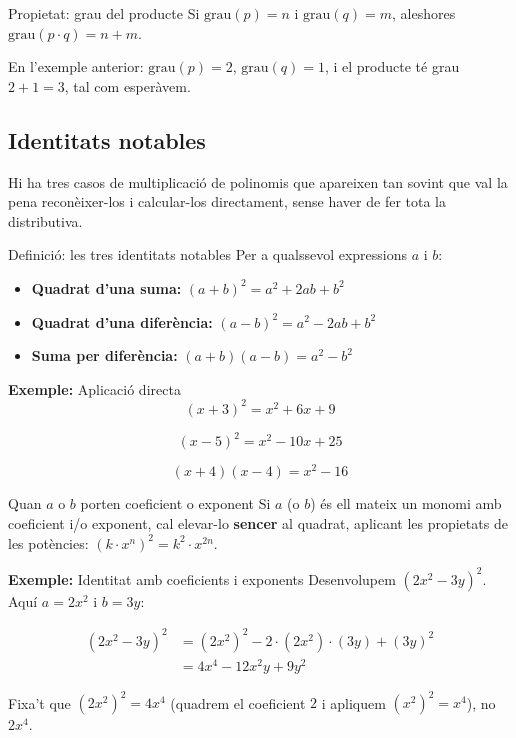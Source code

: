 \begin{propietat}{Propietat: grau del producte}
Si $\text{grau}(p)=n$ i $\text{grau}(q)=m$, aleshores $\text{grau}(p\cdot q)=n+m$.

En l'exemple anterior: $\text{grau}(p)=2$, $\text{grau}(q)=1$, i el producte té grau $2+1=3$, tal com esperàvem.
\end{propietat}

\subsection{Identitats notables}

Hi ha tres casos de multiplicació de polinomis que apareixen tan sovint que val la pena reconèixer-los i calcular-los directament, sense haver de fer tota la distributiva.

\begin{definicio}{Definició: les tres identitats notables}
Per a qualssevol expressions $a$ i $b$:

\begin{itemize}
\item \textbf{Quadrat d'una suma:} $(a+b)^2=a^2+2ab+b^2$
\item \textbf{Quadrat d'una diferència:} $(a-b)^2=a^2-2ab+b^2$
\item \textbf{Suma per diferència:} $(a+b)(a-b)=a^2-b^2$
\end{itemize}
\end{definicio}

\begin{exemple}{\textbf{Exemple:} Aplicació directa}
\[
(x+3)^2=x^2+6x+9
\]

\[
(x-5)^2=x^2-10x+25
\]

\[
(x+4)(x-4)=x^2-16
\]
\end{exemple}

\begin{propietat}{Quan $a$ o $b$ porten coeficient o exponent}
Si $a$ (o $b$) és ell mateix un monomi amb coeficient i/o exponent, cal elevar-lo \textbf{sencer} al quadrat, aplicant les propietats de les potències: $\left(k\cdot x^n\right)^2=k^2\cdot x^{2n}$.
\end{propietat}

\begin{exemple}{\textbf{Exemple:} Identitat amb coeficients i exponents}
Desenvolupem $(2x^2-3y)^2$. Aquí $a=2x^2$ i $b=3y$:

\[
\begin{aligned}
(2x^2-3y)^2 &= (2x^2)^2 - 2\cdot(2x^2)\cdot(3y) + (3y)^2 \\
&= 4x^4 - 12x^2y + 9y^2
\end{aligned}
\]

Fixa't que $(2x^2)^2=4x^4$ (quadrem el coeficient $2$ i apliquem $(x^2)^2=x^4$), no $2x^4$.
\end{exemple}

